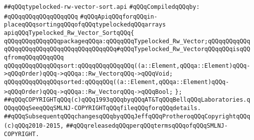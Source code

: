 \label{src/lib/src/typelocked-rw-vector-sort.api}
\verb|##qQQqtypelocked-rw-vector-sort.api|\newline
\newline
\verb|#qQQqCompiledqQQqby:|\newline
\verb|#qQQqqQQqqQQqqQQqqQQq|\newline
\newline
\newline
\newline
\verb|#qQQqApiqQQqforqQQqin-placeqQQqsortingqQQqofqQQqtypelockedqQQqarrays|\newline
\newline
\verb|apiqQQqTypelocked_Rw_Vector_SortqQQq{|\newline
\newline
\verb|qQQqqQQqqQQqqQQqpackageqQQqa:qQQqqQQqTypelocked_Rw_Vector;qQQqqQQqqQQqqQQqqQQqqQQqqQQqqQQqqQQqqQQqqQQq#qQQqTypelocked_Rw_VectorqQQqqQQqisqQQqfromqQQqqQQqqQQq|\newline
\newline
\verb|qQQqqQQqqQQqqQQqsort:qQQqqQQqqQQqqQQq((a::Element,qQQqa::Element)qQQq->qQQqOrder)qQQq->qQQqa::Rw_VectorqQQq->qQQqVoid;|\newline
\verb|qQQqqQQqqQQqqQQqsorted:qQQqqQQq((a::Element,qQQqa::Element)qQQq->qQQqOrder)qQQq->qQQqa::Rw_VectorqQQq->qQQqBool;|\newline
\newline
\verb|};|\newline
\newline
\newline
\newline
\verb|##qQQqCOPYRIGHTqQQq(c)qQQq1993qQQqbyqQQqAT&TqQQqBellqQQqLaboratories.qQQqqQQqSeeqQQqSMLNJ-COPYRIGHTqQQqfileqQQqforqQQqdetails.|\newline
\verb|##qQQqSubsequentqQQqchangesqQQqbyqQQqJeffqQQqProtheroqQQqCopyrightqQQq(c)qQQq2010-2015,|\newline
\verb|##qQQqreleasedqQQqperqQQqtermsqQQqofqQQqSMLNJ-COPYRIGHT.|\newline

